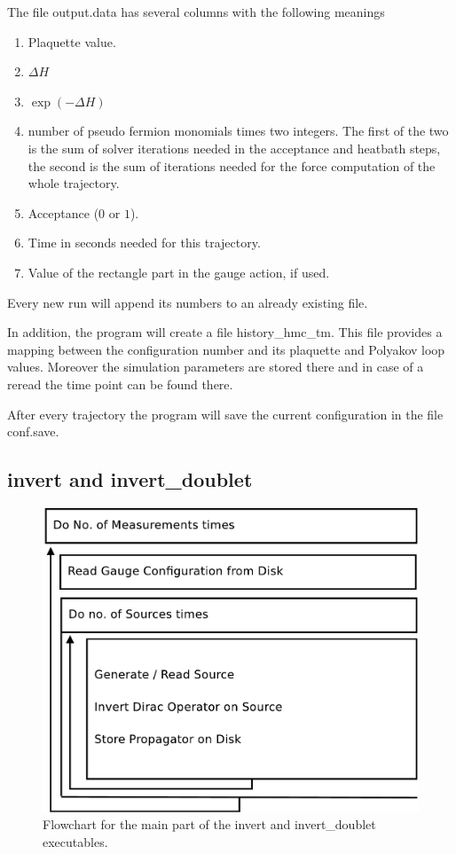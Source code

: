 The file {\ttfamily output.data} has several columns with the
following meanings
\begin{enumerate}
\item Plaquette value.
\item $\Delta H$
\item $\exp(-\Delta H)$
\item number of pseudo fermion monomials times two integers. The first
  of the two is the sum of solver iterations needed
  in the acceptance and heatbath steps, the second is the sum of 
  iterations needed for the force computation of the whole trajectory.
\item Acceptance ($0$ or $1$).
\item Time in seconds needed for this trajectory.
\item Value of the rectangle part in the gauge action, if used.
\end{enumerate}
Every new run will append its numbers to an already existing file.

In addition, the program will create a file {\ttfamily
  history\_hmc\_tm}. This file provides a mapping between the
configuration number and its plaquette and Polyakov loop
values. Moreover the simulation parameters are stored there and in
case of a reread the time point can be found there.

After every trajectory the program will save the current configuration
in the file {\ttfamily conf.save}.

\subsection{{\ttfamily invert} and {\ttfamily invert\_doublet}}

\begin{figure}[t]
  \centering
  \includegraphics[width=0.7\linewidth]{invertflow}
  \caption{Flowchart for the main part of the {\ttfamily invert} and
    {\ttfamily invert\_doublet} executables.}
  \label{fig:invertflow}
\end{figure}

